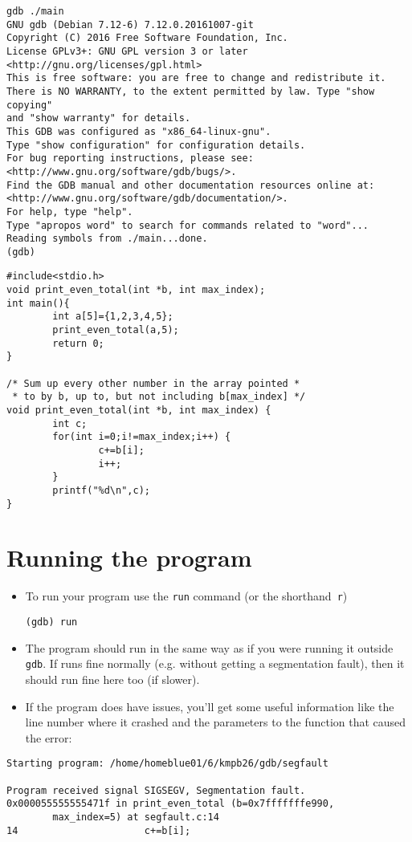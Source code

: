 \documentclass{article}
\begin{document}
\scalebox{0.9}{}
\begin{verbatim}
gdb ./main
GNU gdb (Debian 7.12-6) 7.12.0.20161007-git
Copyright (C) 2016 Free Software Foundation, Inc.
License GPLv3+: GNU GPL version 3 or later <http://gnu.org/licenses/gpl.html>
This is free software: you are free to change and redistribute it.
There is NO WARRANTY, to the extent permitted by law. Type "show copying"
and "show warranty" for details.
This GDB was configured as "x86_64-linux-gnu".
Type "show configuration" for configuration details.
For bug reporting instructions, please see:
<http://www.gnu.org/software/gdb/bugs/>.
Find the GDB manual and other documentation resources online at:
<http://www.gnu.org/software/gdb/documentation/>.
For help, type "help".
Type "apropos word" to search for commands related to "word"...
Reading symbols from ./main...done.
(gdb)
\end{verbatim}



\begin{verbatim}
#include<stdio.h>
void print_even_total(int *b, int max_index);
int main(){
        int a[5]={1,2,3,4,5};
        print_even_total(a,5);
        return 0;
}

/* Sum up every other number in the array pointed *
 * to by b, up to, but not including b[max_index] */
void print_even_total(int *b, int max_index) {
        int c;
        for(int i=0;i!=max_index;i++) {
                c+=b[i];
                i++;
        }
        printf("%d\n",c);
}
\end{verbatim}



\section{Running the program}
\begin{itemize}
\item To run your program use the \verb!run! command (or the shorthand~\verb!r!)
\begin{verbatim}
(gdb) run
\end{verbatim}
\item The program should run in the same way as if you were running it outside \verb!gdb!.
If runs fine normally (e.g. without getting a segmentation fault), then it should run fine here too (if slower).
\item If the program does have issues, you'll get some useful information like the line number where it crashed and the parameters to the function that caused the error:
\end{itemize}
\begin{verbatim}
Starting program: /home/homeblue01/6/kmpb26/gdb/segfault 

Program received signal SIGSEGV, Segmentation fault.
0x000055555555471f in print_even_total (b=0x7fffffffe990, 
        max_index=5) at segfault.c:14
14                      c+=b[i];
\end{verbatim}
\end{document}
